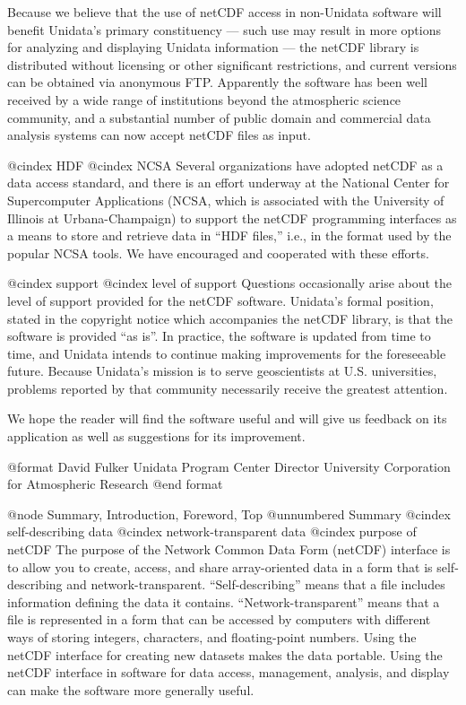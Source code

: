 Because we believe that the use of netCDF access in non-Unidata software
will benefit Unidata's primary constituency --- such use may result in
more options for analyzing and displaying Unidata information --- the
netCDF library is distributed without licensing or other significant
restrictions, and current versions can be obtained via anonymous FTP.
Apparently the software has been well received by a wide range of
institutions beyond the atmospheric science community, and a substantial
number of public domain and commercial data analysis systems can now
accept netCDF files as input.

@cindex HDF
@cindex NCSA
Several organizations have adopted netCDF as a data access standard,
and there is an effort underway at the National Center for Supercomputer
Applications (NCSA, which is associated with the University of Illinois
at Urbana-Champaign) to support the netCDF programming interfaces as a
means to store and retrieve data in ``HDF files,'' i.e., in the format
used by the popular NCSA tools.  We have encouraged and cooperated with
these efforts.

@cindex support
@cindex level of support
Questions occasionally arise about the level of support provided for the
netCDF software.  Unidata's formal position, stated in the copyright
notice which accompanies the netCDF library, is that the software is
provided ``as is''.  In practice, the software is updated from time
to time, and Unidata intends to continue making improvements for the
foreseeable future.  Because Unidata's mission is to serve geoscientists
at U.S. universities, problems reported by that community
necessarily receive the greatest attention.

We hope the reader will find the software useful and will give us
feedback on its application as well as suggestions for its improvement.

@format
David Fulker
Unidata Program Center Director
University Corporation for Atmospheric Research
@end format

@node Summary, Introduction, Foreword, Top
@unnumbered Summary
@cindex self-describing data
@cindex network-transparent data
@cindex purpose of netCDF
The purpose of the Network Common Data Form (netCDF) interface is to
allow you to create, access, and share array-oriented data in a form that is
self-describing and network-transparent.  ``Self-describing'' means that
a file includes information defining the data it contains.
``Network-transparent'' means that a file is represented in a form that
can be accessed by computers with different ways of storing integers,
characters, and floating-point numbers.  Using the netCDF interface for
creating new datasets makes the data portable.  Using the
netCDF interface in software for data access, management,
analysis, and display can make the software more generally useful.

